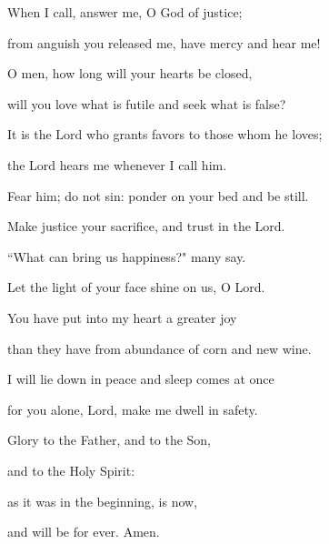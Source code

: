 \noindent  When I call, answer me, O God of justice;~\GreStar{}~\nopagebreak

from anguish you released me, have mercy and hear me!

\noindent O men, how long will your hearts be closed,~\GreStar{}~\nopagebreak

will you love what is futile and seek what is false?

\noindent It is the Lord who grants favors to those whom he loves;~\GreStar{}~\nopagebreak

the Lord hears me whenever I call him.

\noindent Fear him; do not sin: ponder on your bed and be still.~\GreStar{}~\nopagebreak

Make justice your sacrifice, and trust in the Lord.

\noindent ``What can bring us happiness?" many say.~\GreStar{}~\nopagebreak

Let the light of your face shine on us, O Lord.

\noindent You have put into my heart a greater joy~\GreStar{}~\nopagebreak

than they have from abundance of corn and new wine.

\noindent I will lie down in peace and sleep comes at once~\GreStar{}~\nopagebreak

for you alone, Lord, make me dwell in safety.

\noindent Glory to the Father, and to the Son,~\GreStar{}~\nopagebreak

and to the Holy Spirit:

\noindent as it was in the beginning, is now,~\GreStar{}~\nopagebreak

and will be for ever. Amen.
